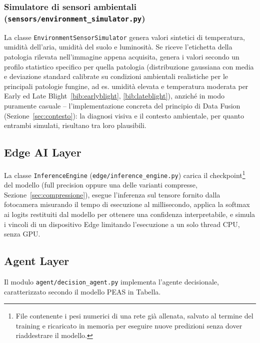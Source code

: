 \subsubsection{Simulatore di sensori ambientali (\texttt{sensors/environment\_simulator.py})}

La classe \texttt{EnvironmentSensorSimulator} genera valori sintetici di
temperatura, umidità dell'aria, umidità del suolo e luminosità. Se riceve
l'etichetta della patologia rilevata nell'immagine appena acquisita, genera
i valori secondo un profilo statistico specifico per quella patologia
(distribuzione gaussiana con media e deviazione standard calibrate su
condizioni ambientali realistiche per le principali patologie fungine,
ad es. umidità elevata e temperatura moderata per Early ed Late
Blight~\ref{bib:earlyblight}, \ref{bib:lateblight}), anziché in modo
puramente casuale -- l'implementazione concreta del principio di Data
Fusion (Sezione~\ref{sec:contesto}): la diagnosi visiva e il contesto
ambientale, per quanto entrambi simulati, risultano tra loro plausibili.

\subsection{Edge AI Layer}
\label{sec:edge-layer}

La classe \texttt{InferenceEngine} (\texttt{edge/inference\_engine.py})
carica il checkpoint\footnote{File contenente i pesi numerici di una rete
già allenata, salvato al termine del training e ricaricato in memoria per
eseguire nuove predizioni senza dover riaddestrare il modello.} del modello
(full precision oppure una delle varianti compresse, Sezione~\ref{sec:compressione}),
esegue l'inferenza sul tensore fornito dalla fotocamera misurando il tempo
di esecuzione al millisecondo, applica la softmax ai logits restituiti dal
modello per ottenere una confidenza interpretabile, e simula i vincoli di
un dispositivo Edge limitando l'esecuzione a un solo thread CPU, senza GPU.

\subsection{Agent Layer}
\label{sec:agent-layer}

Il modulo \texttt{agent/decision\_agent.py} implementa l'agente
decisionale, caratterizzato secondo il modello PEAS in
Tabella.

